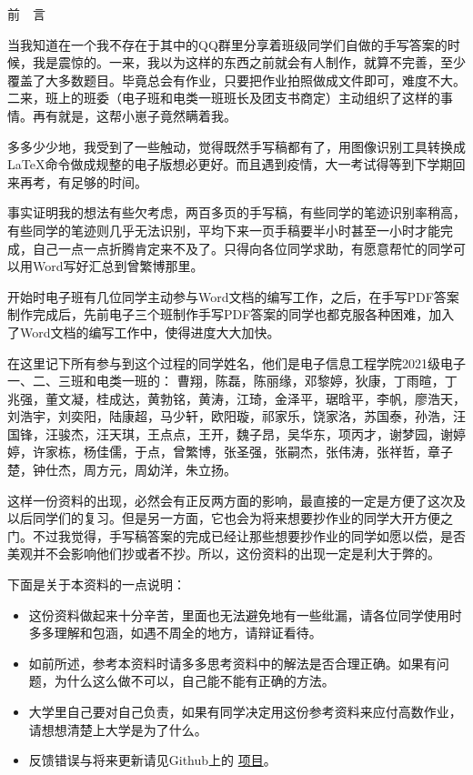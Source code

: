 \documentclass{article}
\begin{document}
	\newpage
	\begin{center}
		前~~言
	\end{center}

	当我知道在一个我不存在于其中的QQ群里分享着班级同学们自做的手写答案的时候，我是震惊的。一来，我以为这样的东西之前就会有人制作，就算不完善，至少覆盖了大多数题目。毕竟总会有作业，只要把作业拍照做成文件即可，难度不大。二来，班上的班委（电子班和电类一班班长及团支书商定）主动组织了这样的事情。再有就是，这帮小崽子竟然瞒着我。
	
	多多少少地，我受到了一些触动，觉得既然手写稿都有了，用图像识别工具转换成\LaTeX 命令做成规整的电子版想必更好。而且遇到疫情，大一考试得等到下学期回来再考，有足够的时间。
	
	事实证明我的想法有些欠考虑，两百多页的手写稿，有些同学的笔迹识别率稍高，有些同学的笔迹则几乎无法识别，平均下来一页手稿要半小时甚至一小时才能完成，自己一点一点折腾肯定来不及了。只得向各位同学求助，有愿意帮忙的同学可以用Word写好汇总到曾繁博那里。
	
	开始时电子班有几位同学主动参与Word文档的编写工作，之后，在手写PDF答案制作完成后，先前电子三个班制作手写PDF答案的同学也都克服各种困难，加入了Word文档的编写工作中，使得进度大大加快。
	
	在这里记下所有参与到这个过程的同学姓名，他们是电子信息工程学院2021级电子一、二、三班和电类一班的：
	曹翔，陈磊，陈丽缘，邓黎婷，狄康，丁雨暄，丁兆强，董文凝，桂成达，黄勃铭，黄涛，江琦，金泽平，琚晗平，李帆，廖浩天，刘浩宇，刘奕阳，陆康超，马少轩，欧阳璇，祁家乐，饶家洛，苏国泰，孙浩，汪国锋，汪骏杰，汪天琪，王点点，王开，魏子昂，吴华东，项丙才，谢梦园，谢婷婷，许家栋，杨佳儒，于点，曾繁博，张圣强，张嗣杰，张伟涛，张祥哲，章子楚，钟仕杰，周方元，周幼洋，朱立扬。
	
	这样一份资料的出现，必然会有正反两方面的影响，最直接的一定是方便了这次及以后同学们的复习。但是另一方面，它也会为将来想要抄作业的同学大开方便之门。不过我觉得，手写稿答案的完成已经让那些想要抄作业的同学如愿以偿，是否美观并不会影响他们抄或者不抄。所以，这份资料的出现一定是利大于弊的。
	
	下面是关于本资料的一点说明：
	
	\begin{itemize}
		\item 这份资料做起来十分辛苦，里面也无法避免地有一些纰漏，请各位同学使用时多多理解和包涵，如遇不周全的地方，请辩证看待。
		\item 如前所述，参考本资料时请多多思考资料中的解法是否合理正确。如果有问题，为什么这么做不可以，自己能不能有正确的方法。
		\item 大学里自己要对自己负责，如果有同学决定用这份参考资料来应付高数作业，请想想清楚上大学是为了什么。
		\item 反馈错误与将来更新请见Github上的 \href{https://github.com/tarregahong/Calculus-I-Tutorials}{项目}。 
	\end{itemize}
	
\end{document}
